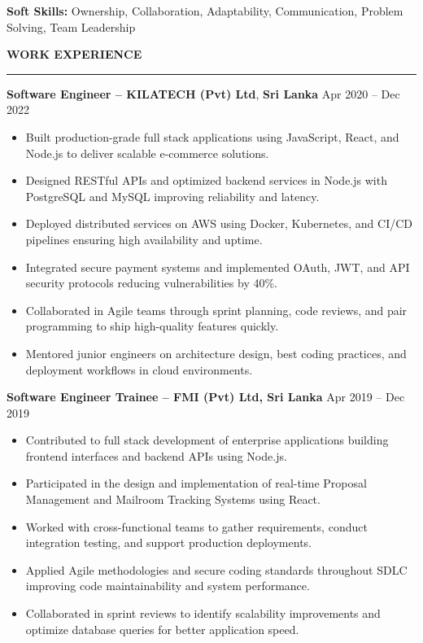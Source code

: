 \documentclass[10pt,letterpaper]{article}
\begin{document}
\textbf{Soft Skills:} Ownership, Collaboration, Adaptability, Communication, Problem Solving, Team Leadership

\vspace{8pt}

\textbf{WORK EXPERIENCE}\\[-8pt]
\noindent\rule{\textwidth}{1pt}

\vspace{-2pt}

\textbf{Software Engineer -- KILATECH (Pvt) Ltd}, \textbf{Sri Lanka} \hfill Apr 2020 -- Dec 2022

\vspace{-1pt}

\begin{itemize}
\item Built production-grade full stack applications using JavaScript, React, and Node.js to deliver scalable e-commerce solutions.
\item Designed RESTful APIs and optimized backend services in Node.js with PostgreSQL and MySQL improving reliability and latency.
\item Deployed distributed services on AWS using Docker, Kubernetes, and CI/CD pipelines ensuring high availability and uptime.
\item Integrated secure payment systems and implemented OAuth, JWT, and API security protocols reducing vulnerabilities by 40\%.
\item Collaborated in Agile teams through sprint planning, code reviews, and pair programming to ship high-quality features quickly.
\item Mentored junior engineers on architecture design, best coding practices, and deployment workflows in cloud environments.
\end{itemize}

\textbf{Software Engineer Trainee -- FMI (Pvt) Ltd, Sri Lanka} \hfill Apr 2019 -- Dec 2019

\vspace{-1pt}

\begin{itemize}
\item Contributed to full stack development of enterprise applications building frontend interfaces and backend APIs using Node.js.
\item Participated in the design and implementation of real-time Proposal Management and Mailroom Tracking Systems using React.
\item Worked with cross-functional teams to gather requirements, conduct integration testing, and support production deployments.
\item Applied Agile methodologies and secure coding standards throughout SDLC improving code maintainability and system performance.
\item Collaborated in sprint reviews to identify scalability improvements and optimize database queries for better application speed.
\end{itemize}
\end{document}
